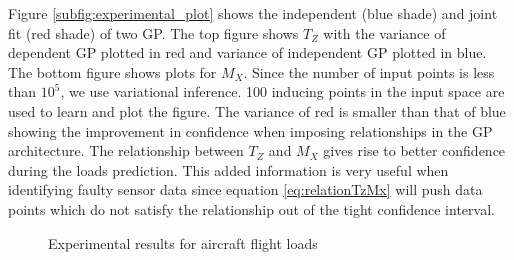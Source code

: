 Figure \ref{subfig:experimental_plot} shows the independent (blue shade) and joint fit (red shade) of two GP. The top figure shows \(T_{Z}\) with the variance of dependent GP plotted in red and variance of independent GP plotted in blue. The bottom figure shows plots for \(M_{X}\). Since the number of input points is less than $10^5$, we use variational inference. 100 inducing points in the input space are used to learn and plot the figure. The variance of red is smaller than that of blue showing the improvement in confidence when imposing relationships in the GP architecture. The relationship between \(T_{Z}\) and \(M_{X}\) gives rise to better confidence during the loads prediction. This added information is very useful when identifying faulty sensor data since equation \ref{eq:relationTzMx} will push data points which do not satisfy the relationship out of the tight confidence interval.

\begin{figure}[!ht]
  \centering
  \quad
  
\caption{Experimental results for aircraft flight loads}
  \label{fig:expFlightLoadsRelationship}
\end{figure}

